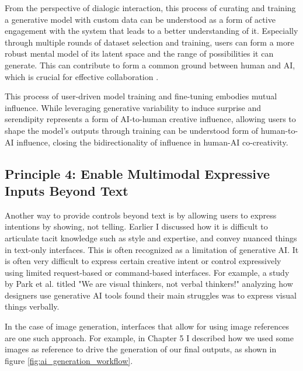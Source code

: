 From the perspective of dialogic interaction, this process of curating and training a generative model with custom data can be understood as a form of active engagement with the system that leads to a better understanding of it. Especially through multiple rounds of dataset selection and training, users can form a more robust mental model of its latent space and the range of possibilities it can generate. This can contribute to form a common ground between human and AI, which is crucial for effective collaboration \cite{Dafoe2021-in}.

This process of user-driven model training and fine-tuning embodies mutual influence. While leveraging generative variability to induce surprise and serendipity represents a form of AI-to-human creative influence, allowing users to shape the model's outputs through training can be understood form of human-to-AI influence, closing the bidirectionality of influence in human-AI co-creativity.


\subsection{Principle 4: Enable Multimodal Expressive Inputs Beyond Text}

Another way to provide controls beyond text is by allowing users to express intentions by showing, not telling. Earlier I discussed how it is difficult to articulate tacit knowledge such as style and expertise, and convey nuanced things in text-only interfaces. This is often recognized as a limitation of generative AI. It is often very difficult to express certain creative intent or control expressively using limited request-based or command-based interfaces. For example, a study by Park et al. \cite{Park2024-gw} titled "We are visual thinkers, not verbal thinkers!" analyzing how designers use generative AI tools found their main struggles was to express visual things verbally.

In the case of image generation, interfaces that allow for using image references are one such approach. For example, in Chapter 5 I described how we used some images as reference to drive the generation of our final outputs, as shown in figure \ref{fig:ai_generation_workflow}.

